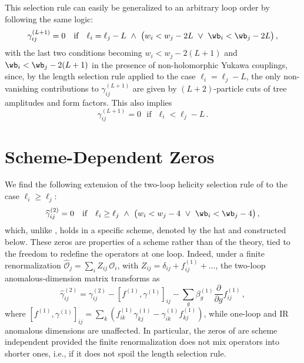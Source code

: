 This selection rule can easily be generalized to an arbitrary loop order by following the same logic: 
\begin{equation}
\label{eq:gen}
    \gamma^{(L+1)}_{ij} = 0  \ \ \ \text{if} \ \  \ \ell_i = \ell_j-L \ \land \  \big(w_i < w_j - 2L  \ \lor  \ \wb_i < \wb_j - 2L\big) \,,
\end{equation}
with the last two conditions becoming $w_i < w_j - 2(L+1)$ and $\wb_i < \wb_j - 2(L+1)$ in the presence of non-holomorphic Yukawa couplings, since, by the length selection rule \cite{Bern:2019wie} applied to the case $\ell_i = \ell_j - L$, the only non-vanishing contributions to $\gamma_{ij}^{(L+1)}$ are given by $(L+2)$-particle cuts of tree amplitudes and form factors. This also implies
\begin{equation}
    \gamma^{(L+1)}_{ij} = 0  \ \ \ \text{if} \ \  \ \ell_i < \ell_j-L\,.
\end{equation}

\section{Scheme-Dependent Zeros\label{sec:2loopSD}}

We find the following extension of the two-loop helicity selection rule of  to the case $\ell_i \ge \ell_j$:
\begin{equation}
\label{eq:dl2}
 \widehat\gamma^{(2)}_{ij} = 0 \  \ \ \text{if} \  \ \ \ell_i \ge \ell_j \ \land \  \big(w_i < w_j - 4 \  \lor  \ \wb_i < \wb_j - 4 \big) \,,
\end{equation}
which, unlike , holds in a specific scheme, denoted by the hat and constructed below.
These zeros are properties of a scheme rather than of the theory, tied to the freedom to redefine the operators at one loop.
Indeed, under a finite renormalization
$\widehat{\mathcal O}_j = \sum_i Z_{ij}\,\mathcal O_i$, with $Z_{ij} = \delta_{ij} + f^{(1)}_{ij} + \dots$, the two-loop anomalous-dimension matrix transforms as \cite{Bern:2020ikv}
\begin{equation}
\widehat\gamma^{(2)}_{ij}
=\gamma^{(2)}_{ij}
-[f^{(1)},\gamma^{(1)}]_{ij}
-\sum_g\beta^{(1)}_g\frac{\partial}{\partial g} f^{(1)}_{ij}\,,
\label{eq:cov}
\end{equation}
where $[f^{(1)},\gamma^{(1)}]_{ij} = \sum_k (f^{(1)}_{ik}\gamma^{(1)}_{kj} - \gamma^{(1)}_{ik}f^{(1)}_{kj})$, while one-loop and IR anomalous dimensions are unaffected.
In particular, the zeros of  are scheme independent provided the finite renormalization does not mix operators into shorter ones, i.e., if it does not spoil the length selection rule.

